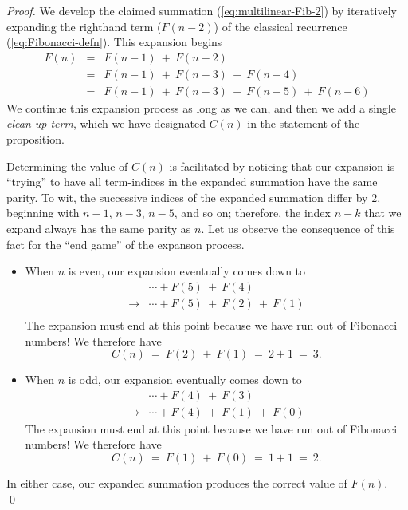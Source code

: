 \begin{proof}
We develop the claimed summation (\ref{eq:multilinear-Fib-2}) by
iteratively expanding the righthand term ($F(n-2)$) of the classical
recurrence (\ref{eq:Fibonacci-defn}).  This expansion begins
\begin{eqnarray}
\label{eq:multilinear-Fib-3}
F(n)
& = &
F(n-1) \ + \ F(n-2) \\
\nonumber
& = &
F(n-1) \ + \ F(n-3) \ + \ F(n-4) \\
\nonumber
& = &
F(n-1) \ + \ F(n-3) \ + \ F(n-5) \ + \ F(n-6)
\end{eqnarray}
We continue this expansion process as long as we can, and then we add
a single {\em clean-up term}, which we have designated $C(n)$ in the
statement of the proposition.

Determining the value of $C(n)$ is facilitated by noticing that our
expansion is ``trying'' to have all term-indices in the expanded
summation have the same parity.  To wit, the successive indices of the
expanded summation differ by $2$, beginning with $n-1$, $n-3$, $n-5$,
and so on; therefore, the index $n-k$ that we expand always has the
same parity as $n$.  Let us observe the consequence of this fact for
the ``end game'' of the expanson process.
\begin{itemize}
\item
When $n$ is even, our expansion eventually comes down to
\[ \begin{array}{cl}
  & \cdots + F(5) \ + \ F(4) \\
\longrightarrow 
  & \cdots + F(5) \ + \ F(2) \ + \ F(1) \\
\end{array}
\]
The expansion must end at this point because we have run out of
Fibonacci numbers!  We therefore have
\[ C(n) \ = \ F(2) \ + \ F(1) \ = \ 2 + 1 \ = \ 3. \]

\item
When $n$ is odd, our expansion eventually comes down to
\[ \begin{array}{cl}
  & \cdots + F(4) \ + \ F(3) \\
\longrightarrow
  & \cdots + F(4) \ + \ F(1) \ + \ F(0)
\end{array}
\]
The expansion must end at this point because we have run out of
Fibonacci numbers!  We therefore have
\[ C(n) \ = \ F(1) \ + \ F(0) \ = \ 1 + 1 \ = \ 2. \]
\end{itemize}
In either case, our expanded summation produces the correct value of
$F(n)$.  \qed
\end{proof}


